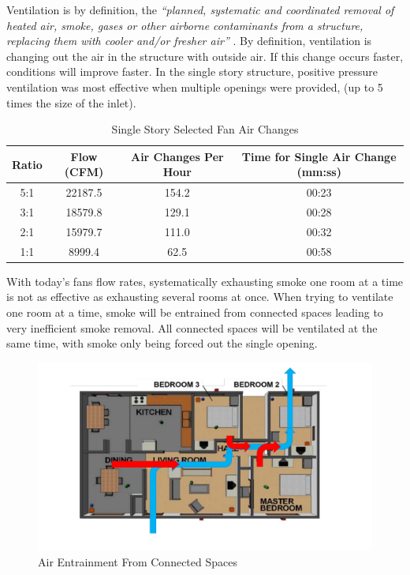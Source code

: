 \documentclass{article}
\begin{document}
Ventilation is by definition, the \textit{``planned, systematic and coordinated removal of heated air, smoke, gases or other airborne contaminants from a structure, replacing them with cooler and/or fresher air''} \cite{Essentials6}. By definition, ventilation is changing out the air in the structure with outside air. If this change occurs faster, conditions will improve faster. In the single story structure, positive pressure ventilation was most effective when multiple openings were provided, (up to 5 times the size of the inlet). 

\begin{table}[H]
	\centering
	\caption{Single Story Selected Fan Air Changes}
	\begin{tabular}{|c|c|c|c|}
		\hline
		Ratio & Flow (CFM) & Air Changes Per Hour & Time for Single Air Change (mm:ss) \\ \hline \hline
		5:1 & 22187.5 & 154.2 & 00:23 \\ \hline
		3:1 & 18579.8 & 129.1 & 00:28 \\ \hline
		2:1 & 15979.7 & 111.0 & 00:32 \\ \hline
		1:1 & 8999.4 & 62.5 & 00:58 \\ \hline
	\end{tabular}
	\label{tab:SingleStoryAirChanges}
\end{table}

With today’s fans flow rates, systematically exhausting smoke one room at a time is not as effective as exhausting several rooms at once.  When trying to ventilate one room at a time, smoke will be entrained from connected spaces leading to very inefficient smoke removal.  All connected spaces will be ventilated at the same time, with smoke only being forced out the single opening.

\begin{figure} [H]
	\centering
	\includegraphics[width = 5in]{0_Images/Tactical_Considerations/Systematic_Vs_Non-Systematic/EntrainedAir.pdf}
	\caption{Air Entrainment From Connected Spaces}
\end{figure}
\end{document}
